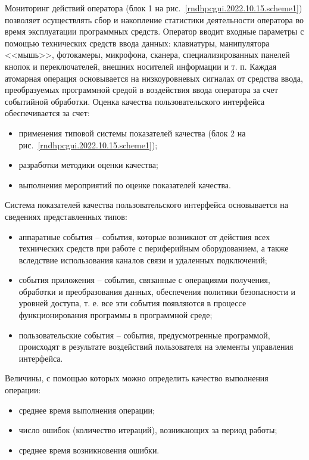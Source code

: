 Мониторинг действий оператора (блок 1 на рис.~\ref{rndhpcgui.2022.10.15.scheme1}) позволяет осуществлять сбор и накопление статистики деятельности оператора во время эксплуатации программных средств. Оператор вводит входные параметры с помощью технических средств ввода данных: клавиатуры, манипулятора <<мышь>>, фотокамеры, микрофона, сканера, специализированных панелей кнопок и переключателей, внешних носителей информации и т. п. Каждая атомарная операция основывается на низкоуровневых сигналах от средства ввода, преобразуемых программной средой в воздействия ввода оператора за счет событийной обработки.
Оценка качества пользовательского интерфейса обеспечивается за счет:
\begin{itemize}
	\item применения типовой системы показателей качества (блок 2 на рис.~\ref{rndhpcgui.2022.10.15.scheme1});
	\item разработки методики оценки качества;
	\item выполнения мероприятий по оценке показателей качества.
\end{itemize}

	Система показателей качества пользовательского интерфейса основывается на сведениях представленных типов:
\begin{itemize}
	\item аппаратные события -- события, которые возникают от действия всех технических средств при работе с периферийным оборудованием, а также вследствие использования каналов связи и удаленных подключений;
	\item события приложения -- события, связанные с операциями получения, обработки и преобразования данных, обеспечения политики безопасности и уровней доступа, т. е. все эти события появляются в процессе функционирования программы в программной среде;
	\item пользовательские события -- события, предусмотренные программой, происходят в результате воздействий пользователя на элементы управления интерфейса.
\end{itemize}

Величины, с помощью которых можно определить качество выполнения операции:
\begin{itemize}
	\item среднее время выполнения операции; 
	\item число ошибок (количество итераций), возникающих за период работы;
	\item среднее время возникновения ошибки.
\end{itemize}

